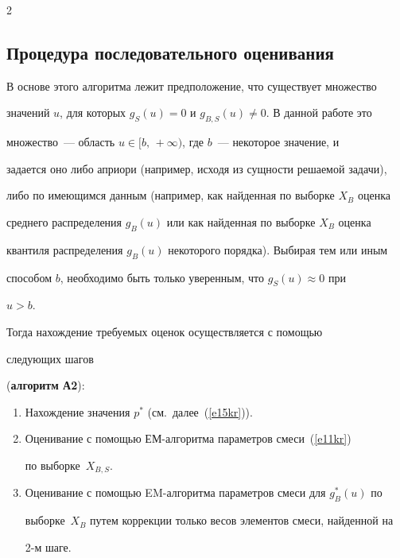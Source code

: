 \begin{multicols}{2}
\subsection{Процедура последовательного оценивания} %


     


     В основе этого алгоритма лежит предположение, что существует множество 


значений $u$, для которых $g_S(u)=0$ и $g_{B,S}(u)\not= 0$. В данной работе это 


множество~--- область $u\in [b,\,+\infty)$, где $b$~--- некоторое значение, и 


задается оно либо априори (например, исходя из сущности решаемой задачи), 


либо по имеющимся данным (например, как найденная по выборке $X_B$ оценка 


среднего распределения $g_B(u)$ или как найденная по выборке $X_B$ оценка 


квантиля распределения $g_B(u)$ некоторого порядка). Выбирая тем или иным 


способом $b$, необходимо быть только уверенным, что $g_S(u)\approx 0$ при 


$u>b$.


     


     Тогда нахождение требуемых оценок осуществляется с помощью 


следующих шагов


(\textbf{алгоритм А2}):








\noindent


\begin{enumerate}[1.]


\item Нахождение значения $p^*$ (см.\ далее~(\ref{e15kr})).


\item Оценивание с помощью ЕМ-алгоритма па\-ра\-мет\-ров смеси~(\ref{e11kr}) 


по выборке~$X_{B,S}$.


\item Оценивание с помощью EM-алгоритма па\-ра\-мет\-ров смеси для $g_B^*(u)$ по 


выборке~$X_B$ путем коррекции только весов элементов смеси, найден\-ной на 


2-м шаге.



\end{enumerate}
\end{multicols}
